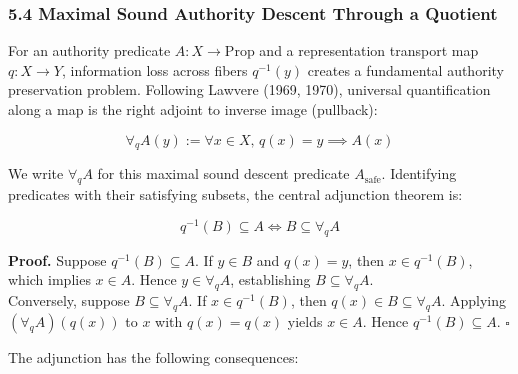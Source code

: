 \documentclass[
  10pt,
]{article}
\begin{document}
\subsubsection{5.4 Maximal Sound Authority Descent Through a Quotient}\label{maximal-sound-authority-descent-through-a-quotient}

For an authority predicate \hypertarget{math-E0060-0073}{}{\(A : X \to \mathrm{Prop}\)} and a representation transport map \hypertarget{math-E0061-0074}{}{\(q : X \to Y\)}, information loss across fibers \hypertarget{math-E0062-0075}{}{\(q^{-1}(y)\)} creates a fundamental authority preservation problem. Following Lawvere (1969, 1970), universal quantification along a map is the right adjoint to inverse image (pullback):

\hypertarget{math-E0063-0076}{}{\[\forall_q A(y) := \forall x \in X,\, q(x) = y \implies A(x)\]}

We write \hypertarget{math-E0064-0077}{}{\(\forall_q A\)} for this maximal sound descent predicate \hypertarget{math-E0065-0078}{}{\(A_{\mathrm{safe}}\)}. Identifying predicates with their satisfying subsets, the central adjunction theorem is:

\hypertarget{math-E0066-0079}{}{\[\boxed{ q^{-1}(B) \subseteq A \iff B \subseteq \forall_q A }\]}

\textbf{Proof.} Suppose \hypertarget{math-E0067-0080}{}{\(q^{-1}(B) \subseteq A\)}. If \hypertarget{math-E0068-0081}{}{\(y \in B\)} and \hypertarget{math-E0069-0082}{}{\(q(x) = y\)}, then \hypertarget{math-E0070-0083}{}{\(x \in q^{-1}(B)\)}, which implies \hypertarget{math-E0071-0084}{}{\(x \in A\)}. Hence \hypertarget{math-E0072-0085}{}{\(y \in \forall_q A\)}, establishing \hypertarget{math-E0073-0086}{}{\(B \subseteq \forall_q A\)}.\\
Conversely, suppose \hypertarget{math-E0073-0087}{}{\(B \subseteq \forall_q A\)}. If \hypertarget{math-E0070-0088}{}{\(x \in q^{-1}(B)\)}, then \hypertarget{math-E0074-0089}{}{\(q(x) \in B \subseteq \forall_q A\)}. Applying \hypertarget{math-E0075-0090}{}{\((\forall_q A)(q(x))\)} to \hypertarget{math-E0076-0091}{}{\(x\)} with \hypertarget{math-E0077-0092}{}{\(q(x) = q(x)\)} yields \hypertarget{math-E0071-0093}{}{\(x \in A\)}. Hence \hypertarget{math-E0067-0094}{}{\(q^{-1}(B) \subseteq A\)}. \hypertarget{math-E0036-0095}{}{\(\square\)}

The adjunction has the following consequences:
\end{document}
